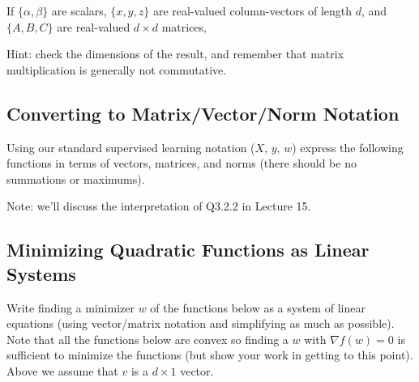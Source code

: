\documentclass{article}
\begin{document}
If $\{\alpha,\beta\}$ are scalars, $\{x,y,z\}$ are real-valued column-vectors of length $d$,
and $\{A,B,C\}$ are real-valued $d\times d$ matrices, 

Hint: check the dimensions of the result, and remember that matrix multiplication is generally not commutative.


\subsection{Converting to Matrix/Vector/Norm Notation}

Using our standard supervised learning notation ($X$, $y$, $w$)
express the following functions in terms of vectors, matrices, and norms (there should be no summations or maximums).

Note: we'll discuss the interpretation of Q3.2.2 in Lecture 15.


\subsection{Minimizing Quadratic Functions as Linear Systems}

Write finding a minimizer $w$ of the functions below as a system of linear equations (using vector/matrix notation and simplifying as much as possible). Note that all the functions below are convex  so finding a $w$ with $\nabla f(w) = 0$ is sufficient to minimize the functions (but show your work in getting to this point).
Above we assume that $v$ is a $d \times 1$ vector.
\end{document}
